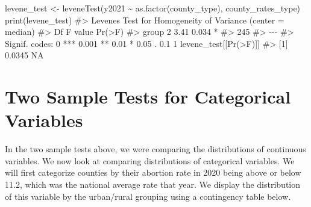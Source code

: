 \documentclass[
  letterpaper,
]{krantz}
\makeatletter
\newenvironment{Shaded}{\begin{snugshade}}{\end{snugshade}}
\newcommand{\CommentTok}[1]{\textcolor[rgb]{0.37,0.37,0.37}{#1}}
\newcommand{\FloatTok}[1]{\textcolor[rgb]{0.68,0.00,0.00}{#1}}
\newcommand{\FunctionTok}[1]{\textcolor[rgb]{0.28,0.35,0.67}{#1}}
\newcommand{\NormalTok}[1]{\textcolor[rgb]{0.00,0.23,0.31}{#1}}
\newcommand{\OtherTok}[1]{\textcolor[rgb]{0.00,0.23,0.31}{#1}}
\newcommand{\SpecialCharTok}[1]{\textcolor[rgb]{0.37,0.37,0.37}{#1}}
\newcommand{\StringTok}[1]{\textcolor[rgb]{0.13,0.47,0.30}{#1}}
\newenvironment{kframe}{%
\medskip{}
\setlength{\fboxsep}{.8em}
 \def\at@end@of@kframe{}%
 \ifinner\ifhmode%
  \def\at@end@of@kframe{\end{minipage}}%
  \begin{minipage}{\columnwidth}%
 \fi\fi%
 \def\FrameCommand##1{\hskip\@totalleftmargin \hskip-\fboxsep
 \colorbox{shadecolor}{##1}\hskip-\fboxsep
     \hskip-\linewidth \hskip-\@totalleftmargin \hskip\columnwidth}%
 \MakeFramed {\advance\hsize-\width
   \@totalleftmargin\z@ \linewidth\hsize
   \@setminipage}}%
 {\par\unskip\endMakeFramed%
 \at@end@of@kframe}
\renewenvironment{Shaded}{\begin{kframe}}{\end{kframe}}
\makeatother
\begin{document}
\begin{Shaded}
\begin{Highlighting}[]
\NormalTok{levene\_test }\OtherTok{\textless{}{-}} \FunctionTok{leveneTest}\NormalTok{(y2021 }\SpecialCharTok{\textasciitilde{}} \FunctionTok{as.factor}\NormalTok{(county\_type), }
\NormalTok{                              county\_rates\_type)}
\FunctionTok{print}\NormalTok{(levene\_test)}
\CommentTok{\#\textgreater{} Levene\textquotesingle{}s Test for Homogeneity of Variance (center = median)}
\CommentTok{\#\textgreater{}        Df F value Pr(\textgreater{}F)  }
\CommentTok{\#\textgreater{} group   2    3.41  0.034 *}
\CommentTok{\#\textgreater{}       245                 }
\CommentTok{\#\textgreater{} {-}{-}{-}}
\CommentTok{\#\textgreater{} Signif. codes:  0 \textquotesingle{}***\textquotesingle{} 0.001 \textquotesingle{}**\textquotesingle{} 0.01 \textquotesingle{}*\textquotesingle{} 0.05 \textquotesingle{}.\textquotesingle{} 0.1 \textquotesingle{} \textquotesingle{} 1}
\NormalTok{levene\_test[[}\StringTok{\textquotesingle{}Pr(\textgreater{}F)\textquotesingle{}}\NormalTok{]]}
\CommentTok{\#\textgreater{} [1] 0.0345     NA}
\end{Highlighting}
\end{Shaded}

\section{Two Sample Tests for Categorical
Variables}\label{two-sample-tests-for-categorical-variables}

In the two sample tests above, we were comparing the distributions of
continuous variables. We now look at comparing distributions of
categorical variables. We will first categorize counties by their
abortion rate in 2020 being above or below 11.2, which was the national
average rate that year. We display the distribution of this variable by
the urban/rural grouping using a contingency table below.

\begin{Shaded}
\end{Shaded}
\end{document}
